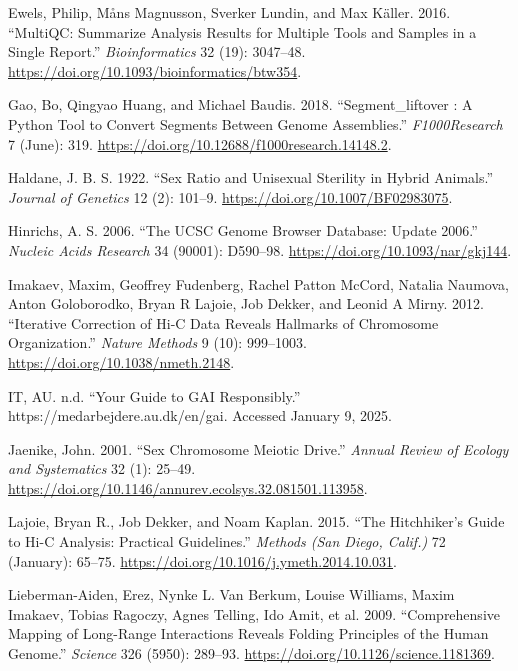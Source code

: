 \documentclass[
  11pt,
  a4paper,
]{scrbook}
\newlength{\cslhangindent}
\newenvironment{CSLReferences}[2] %
 {\begin{list}{}{%
  \setlength{\itemindent}{0pt}
  \setlength{\leftmargin}{0pt}
  \setlength{\parsep}{0pt}
  \ifodd #1
   \setlength{\leftmargin}{\cslhangindent}
   \setlength{\itemindent}{-1\cslhangindent}
  \fi
  \setlength{\itemsep}{#2\baselineskip}}}
 {\end{list}}
\let\oldemph\emph
\renewcommand\emph[1]{\oldemph{\color{gray}#1}}
\begin{document}
\begin{CSLReferences}{1}{0}
Ewels, Philip, Måns Magnusson, Sverker Lundin, and Max Käller. 2016.
{``{MultiQC}: Summarize Analysis Results for Multiple Tools and Samples
in a Single Report.''} \emph{Bioinformatics} 32 (19): 3047--48.
\url{https://doi.org/10.1093/bioinformatics/btw354}.

Gao, Bo, Qingyao Huang, and Michael Baudis. 2018. {``Segment\_liftover :
A {Python} Tool to Convert Segments Between Genome Assemblies.''}
\emph{F1000Research} 7 (June): 319.
\url{https://doi.org/10.12688/f1000research.14148.2}.

Haldane, J. B. S. 1922. {``Sex Ratio and Unisexual Sterility in Hybrid
Animals.''} \emph{Journal of Genetics} 12 (2): 101--9.
\url{https://doi.org/10.1007/BF02983075}.

Hinrichs, A. S. 2006. {``The {UCSC Genome Browser Database}: Update
2006.''} \emph{Nucleic Acids Research} 34 (90001): D590--98.
\url{https://doi.org/10.1093/nar/gkj144}.

Imakaev, Maxim, Geoffrey Fudenberg, Rachel Patton McCord, Natalia
Naumova, Anton Goloborodko, Bryan R Lajoie, Job Dekker, and Leonid A
Mirny. 2012. {``Iterative Correction of {Hi-C} Data Reveals Hallmarks of
Chromosome Organization.''} \emph{Nature Methods} 9 (10): 999--1003.
\url{https://doi.org/10.1038/nmeth.2148}.

IT, AU. n.d. {``Your Guide to {GAI} Responsibly.''}
https://medarbejdere.au.dk/en/gai. Accessed January 9, 2025.

Jaenike, John. 2001. {``Sex {Chromosome Meiotic Drive}.''} \emph{Annual
Review of Ecology and Systematics} 32 (1): 25--49.
\url{https://doi.org/10.1146/annurev.ecolsys.32.081501.113958}.

Lajoie, Bryan R., Job Dekker, and Noam Kaplan. 2015. {``The
{Hitchhiker}'s {Guide} to {Hi-C Analysis}: {Practical} Guidelines.''}
\emph{Methods (San Diego, Calif.)} 72 (January): 65--75.
\url{https://doi.org/10.1016/j.ymeth.2014.10.031}.

Lieberman-Aiden, Erez, Nynke L. Van Berkum, Louise Williams, Maxim
Imakaev, Tobias Ragoczy, Agnes Telling, Ido Amit, et al. 2009.
{``Comprehensive {Mapping} of {Long-Range Interactions Reveals Folding
Principles} of the {Human Genome}.''} \emph{Science} 326 (5950):
289--93. \url{https://doi.org/10.1126/science.1181369}.


\end{CSLReferences}
\end{document}
